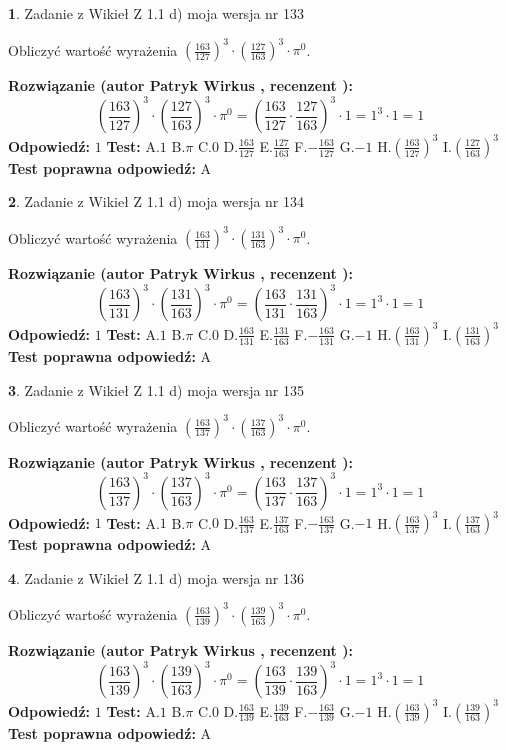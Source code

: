 \documentclass[12pt, a4paper]{article}
\theoremstyle{definition} %
\newtheorem{zad}{}
\newcommand{\zadStart}[1]{\begin{zad}#1\newline}
\newcommand{\zadStop}{\end{zad}}
\newcommand{\rozwStart}[2]{\noindent \textbf{Rozwiązanie (autor #1 , recenzent #2): }\newline}
\newcommand{\rozwStop}{\newline}
\newcommand{\odpStart}{\noindent \textbf{Odpowiedź:}\newline}
\newcommand{\odpStop}{\newline}
\newcommand{\testStart}{\noindent \textbf{Test:}\newline}
\newcommand{\testStop}{\newline}
\newcommand{\kluczStart}{\noindent \textbf{Test poprawna odpowiedź:}\newline}
\newcommand{\kluczStop}{\newline}
\begin{document}
\zadStart{Zadanie z Wikieł Z 1.1 d) moja wersja nr 133}

Obliczyć wartość wyrażenia $(\frac{163}{127})^{3} \cdot (\frac{127}{163})^{3} \cdot \pi^{0}$.
\zadStop
\rozwStart{Patryk Wirkus}{}
$$(\frac{163}{127})^{3} \cdot (\frac{127}{163})^{3} \cdot \pi^{0} = (\frac{163}{127} \cdot \frac{127}{163})^{3} \cdot 1 = 1^{3} \cdot 1 = 1$$
\rozwStop
\odpStart
$1$
\odpStop
\testStart
A.$1$ B.$\pi$ C.$0$ D.$\frac{163}{127}$ E.$\frac{127}{163}$
F.$-\frac{163}{127}$ G.$-1$
H.$(\frac{163}{127})^{3}$
I.$(\frac{127}{163})^{3}$
\testStop
\kluczStart
A
\kluczStop



\zadStart{Zadanie z Wikieł Z 1.1 d) moja wersja nr 134}

Obliczyć wartość wyrażenia $(\frac{163}{131})^{3} \cdot (\frac{131}{163})^{3} \cdot \pi^{0}$.
\zadStop
\rozwStart{Patryk Wirkus}{}
$$(\frac{163}{131})^{3} \cdot (\frac{131}{163})^{3} \cdot \pi^{0} = (\frac{163}{131} \cdot \frac{131}{163})^{3} \cdot 1 = 1^{3} \cdot 1 = 1$$
\rozwStop
\odpStart
$1$
\odpStop
\testStart
A.$1$ B.$\pi$ C.$0$ D.$\frac{163}{131}$ E.$\frac{131}{163}$
F.$-\frac{163}{131}$ G.$-1$
H.$(\frac{163}{131})^{3}$
I.$(\frac{131}{163})^{3}$
\testStop
\kluczStart
A
\kluczStop



\zadStart{Zadanie z Wikieł Z 1.1 d) moja wersja nr 135}

Obliczyć wartość wyrażenia $(\frac{163}{137})^{3} \cdot (\frac{137}{163})^{3} \cdot \pi^{0}$.
\zadStop
\rozwStart{Patryk Wirkus}{}
$$(\frac{163}{137})^{3} \cdot (\frac{137}{163})^{3} \cdot \pi^{0} = (\frac{163}{137} \cdot \frac{137}{163})^{3} \cdot 1 = 1^{3} \cdot 1 = 1$$
\rozwStop
\odpStart
$1$
\odpStop
\testStart
A.$1$ B.$\pi$ C.$0$ D.$\frac{163}{137}$ E.$\frac{137}{163}$
F.$-\frac{163}{137}$ G.$-1$
H.$(\frac{163}{137})^{3}$
I.$(\frac{137}{163})^{3}$
\testStop
\kluczStart
A
\kluczStop



\zadStart{Zadanie z Wikieł Z 1.1 d) moja wersja nr 136}

Obliczyć wartość wyrażenia $(\frac{163}{139})^{3} \cdot (\frac{139}{163})^{3} \cdot \pi^{0}$.
\zadStop
\rozwStart{Patryk Wirkus}{}
$$(\frac{163}{139})^{3} \cdot (\frac{139}{163})^{3} \cdot \pi^{0} = (\frac{163}{139} \cdot \frac{139}{163})^{3} \cdot 1 = 1^{3} \cdot 1 = 1$$
\rozwStop
\odpStart
$1$
\odpStop
\testStart
A.$1$ B.$\pi$ C.$0$ D.$\frac{163}{139}$ E.$\frac{139}{163}$
F.$-\frac{163}{139}$ G.$-1$
H.$(\frac{163}{139})^{3}$
I.$(\frac{139}{163})^{3}$
\testStop
\kluczStart
A
\kluczStop
\end{document}
